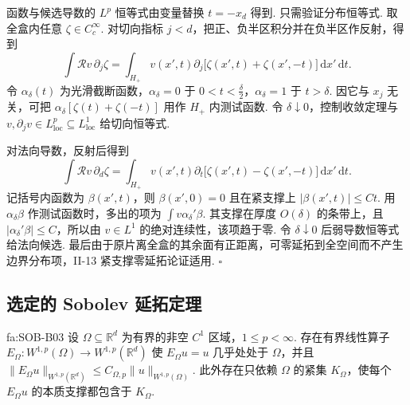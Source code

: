 \begin{FAProof}
函数与候选导数的 \(\displaystyle L^p\) 恒等式由变量替换 \(\displaystyle t=-x_d\) 得到. 只需验证分布恒等式. 取全盒内任意 \(\displaystyle\zeta\in C_c^\infty\). 对切向指标 \(\displaystyle j<d\)，把正、负半区积分并在负半区作反射，得到
\[
\int \mathcal Rv\,\partial_j\zeta
=
\int_{H_+}v(x',t)\partial_j\bigl[\zeta(x',t)+\zeta(x',-t)\bigr] \,\mathrm{d}x'\,\mathrm{d}t.
\]
令 \(\displaystyle\alpha_\delta(t)\) 为光滑截断函数，\(\displaystyle\alpha_\delta=0\) 于 \(\displaystyle0<t<\frac{\delta}{2}\)，\(\displaystyle\alpha_\delta=1\) 于 \(\displaystyle t>\delta\). 因它与 \(\displaystyle x_j\) 无关，可把 \(\displaystyle\alpha_\delta[\zeta(t)+\zeta(-t)]\) 用作 \(\displaystyle H_+\) 内测试函数. 令 \(\displaystyle\delta\downarrow0\)，控制收敛定理与 \(\displaystyle v,\partial_jv\in L^p_{\mathrm{loc}}\subseteq L^1_{\mathrm{loc}}\) 给切向恒等式.

对法向导数，反射后得到
\[
\int \mathcal Rv\,\partial_d\zeta
=
\int_{H_+}v(x',t)\partial_t\bigl[\zeta(x',t)-\zeta(x',-t)\bigr] \,\mathrm{d}x'\,\mathrm{d}t.
\]
记括号内函数为 \(\displaystyle\beta(x',t)\)，则 \(\displaystyle\beta(x',0)=0\) 且在紧支撑上 \(\displaystyle|\beta(x',t)|\leqslant Ct\). 用 \(\displaystyle\alpha_\delta\beta\) 作测试函数时，多出的项为 \(\displaystyle\int v\alpha_\delta'\beta\). 其支撑在厚度 \(\displaystyle O(\delta)\) 的条带上，且 \(\displaystyle|\alpha_\delta'\beta|\leqslant C\)，所以由 \(\displaystyle v\in L^1\) 的绝对连续性，该项趋于零. 令 \(\displaystyle\delta\downarrow0\) 后弱导数恒等式给法向候选. 最后由于原片离全盒的其余面有正距离，可零延拓到全空间而不产生边界分布项，II-13 紧支撑零延拓论证适用.
\hfill\(\square\)
\end{FAProof}

\subsection{选定的 Sobolev 延拓定理}

\begin{FATheorem}{fa:SOB-B03}
设 \(\displaystyle\Omega\subseteq\mathbb R^d\) 为有界的非空 \(\displaystyle C^1\) 区域，\(\displaystyle1\leqslant p<\infty\). 存在有界线性算子 \(\displaystyle E_\Omega:W^{1,p}(\Omega)\longrightarrow W^{1,p}(\mathbb R^d)\)
使 \(\displaystyle E_\Omega u=u\) 几乎处处于 \(\displaystyle\Omega\)，并且 \(\displaystyle \|E_\Omega u\|_{W^{1,p}(\mathbb R^d)} \leqslant C_{\Omega,p}\|u\|_{W^{1,p}(\Omega)}.\)
此外存在只依赖 \(\displaystyle\Omega\) 的紧集 \(\displaystyle K_\Omega\)，使每个 \(\displaystyle E_\Omega u\) 的本质支撑都包含于 \(\displaystyle K_\Omega\).
\end{FATheorem}

